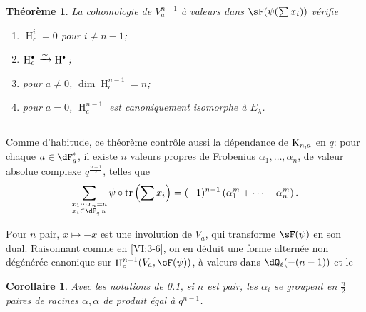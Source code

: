 \documentclass[oneside]{book}
\DeclareMathOperator{\h}{H}
\DeclareMathOperator{\tr}{tr}
\newcommand{\iso}{\xrightarrow\sim}
\newcommand{\kloos}{\textnormal{K}} %
\theoremstyle{sga-source}
\theoremstyle{sga-source-dash}
\theoremstyle{sga-source-dotdash}
\theoremstyle{sga-source-number-note-dash}
\theoremstyle{sga-source-note-number-dotdash}
\theoremstyle{sga-source-example-dotdash}
\theoremstyle{sga-source-inline-number}
\theoremstyle{sga-source-bare-number}
\theoremstyle{sga-source}
\newtheorem{corollary_}[subsection]{Corollaire}
\newtheorem{theorem_}[subsection]{Théorème}
\let\oldbullet\bullet
\renewcommand{\bullet}{\textnormal{\tiny$\oldbullet$}}
\newcommand{\PrintPage}[1]{}\newcommand{\MathPage}[1]{}\newcommand{\PrintCite}[2]{#1}\newcommand{\var}[3]{#2}
\begin{document}
\begin{theorem_}\label{VI:7-4}
La cohomologie de $V_a^{n-1}$ à valeurs dans $\sF(\psi(\sum x_i))$ vérifie 
\begin{enumerate}[\indent (i)]
  \item $\h_c^i=0$ pour $i\ne n-1$; 
  \item $\h_c^\bullet{} \iso \h^\bullet{}$; 
  \item pour $a\ne 0$, $\dim \h_c^{n-1}{}=n$; 
  \PrintPage{221}
\item pour $a=0$, $\h_c^{n-1}{}$ est canoniquement isomorphe à $E_\lambda$. 
\end{enumerate}
\end{theorem_}





\subsection{}\label{VI:7-5}

Comme d'habitude, ce théorème contrôle aussi la dépendance de 
$\kloos_{n,a}$ en $q$: pour chaque $a\in \dF_q^\ast$, il existe $n$ valeurs 
propres de Frobenius $\alpha_1,\dots,\alpha_n$, de valeur absolue complexe 
$q^{\frac{n-1}{2}}$, telles que 
\[
  \sum_{\substack{x_1\dotsm x_n = a \\ x_i\in \dF_{q^m}}} \psi\circ \tr\left(\sum x_i\right) = (-1)^{n-1} \left(\alpha_1^m + \cdots + \alpha_n^m \right) \text{.} 
\]

Pour $n$ pair, $x\mapsto -x$ est une involution de $V_a$, qui transforme 
$\sF(\psi)$ en son dual. Raisonnant comme en \ref{VI:3-6}, on en déduit une 
forme alternée non dégénérée canonique sur $\h_c^{n-1}(V_a,\sF(\psi))$, 
à valeurs dans $\dQ_\ell(-(n-1))$ et le 





\begin{corollary_}\label{VI:7-6}
Avec les notations de \ref{VI:7-5}, si $n$ est pair, les $\alpha_i$ se groupent 
en $\frac n 2$ paires de racines $\alpha,\bar\alpha$ de produit égal à 
$q^{n-1}$. 
\end{corollary_}





\subsection{}\label{VI:7-7}
\end{document}
